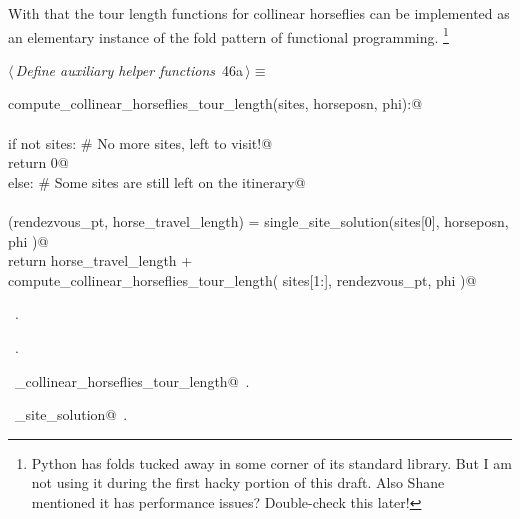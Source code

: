 \documentclass[11.5pt]{report}
\begin{document}
\vspace{-0.8cm}
With that the tour length functions for collinear horseflies can be implemented as 
an elementary instance of the fold pattern of functional programming. 
\footnote{Python has folds tucked away in some corner of its standard library. 
But I am not using it during the first hacky portion of this draft. Also Shane 
mentioned it has performance issues? Double-check this later!}


\begin{flushleft} \small\label{scrap65}\raggedright\small
{} $\langle\,${\itshape Define auxiliary helper functions}\nobreak\ {\footnotesize {46a}}$\,\rangle\equiv$
\vspace{-1ex}
\begin{list}{}{} \item
\mbox{}\verb@def compute_collinear_horseflies_tour_length(sites, horseposn, phi):@\\
\mbox{}\verb@@\\
\mbox{}\verb@     if not sites: # No more sites, left to visit!@\\
\mbox{}\verb@          return 0@\\
\mbox{}\verb@     else:         # Some sites are still left on the itinerary@\\
\mbox{}\verb@@\\
\mbox{}\verb@          (rendezvous_pt, horse_travel_length) = single_site_solution(sites[0], horseposn, phi )@\\
\mbox{}\verb@          return horse_travel_length  + \@\\
\mbox{}\verb@                 compute_collinear_horseflies_tour_length( sites[1:], rendezvous_pt, phi )@\\
\mbox{}\verb@@{\NWsep}
\end{list}
\vspace{-1.5ex}
\footnotesize
\begin{list}{}{\setlength{\itemsep}{-\parsep}\setlength{\itemindent}{-\leftmargin}}
\item \NWtxtMacroDefBy\ .
\item \NWtxtMacroRefIn\ .
\item \NWtxtIdentsDefed\nobreak\  \verb@compute_collinear_horseflies_tour_length@\nobreak\ .\item \NWtxtIdentsUsed\nobreak\  \verb@single_site_solution@\nobreak\ .
\item{}
\end{list}
\vspace{4ex}
\end{flushleft}
\end{document}
